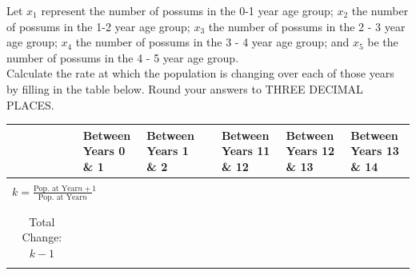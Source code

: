 \documentclass[10pt]{article}
\begin{document}
\begin{enumerate}
    Let $x_1$ represent the number of possums in the 0-1 year age group; $x_2$ the number of possums in the 1-2 year age
    group; $x_3$ the number of possums in the 2 - 3 year age group; $x_4$ the number of possums in the 3 - 4 year age group;
    and $x_5$ be the number of possums in the 4 - 5 year age group. \\
    Calculate the rate at which the population is changing over each of those years by filling in the table below. Round
    your answers to THREE DECIMAL PLACES.

    \begin{tabular}{|c|p{2cm}|p{2cm}|c|p{2.2cm}|p{2.2cm}|p{2.2cm}|}
        \cline{2-7}
        \multicolumn{1}{c|}{} & Between Years 0 \& 1 & Between Years 1 \& 2 & & Between Years 11 \& 12 & Between Years 12 \& 13 & Between Years 13 \& 14 \\
        \hline
        & & & & & & \\
        $\displaystyle k = \frac{\text{Pop. at Year} n + 1}{\text{Pop. at Year} n}$ & & & & & & \\
        & & & & & & \\
        \hline
        & & & & & & \\
        Total Change: $k-1$ & & & & & & \\
        & & & & & & \\
        \hline
    \end{tabular}

\newpage


\end{enumerate}
\end{document}
